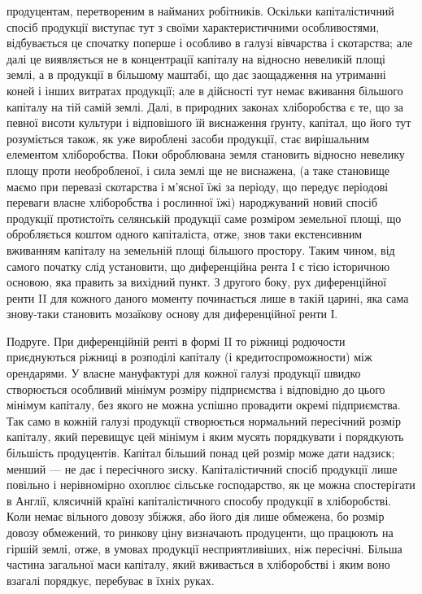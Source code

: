\parcont{}  %
продуцентам, перетвореним в найманих робітників. Оскільки капіталістичний
спосіб продукції виступає тут з своїми характеристичними особливостями,
відбувається це спочатку поперше і особливо в галузі вівчарства і скотарства;
але далі це виявляється не в концентрації капіталу на відносно невеликій
площі землі, а в продукції в більшому маштабі, що дає заощадження на
утриманні коней і інших витратах продукції; але в дійсності тут немає вживання
більшого капіталу на тій самій землі. Далі, в природних законах хліборобства
є те, що за певної висоти культури і відповішого їй виснаження
ґрунту, капітал, що його тут розуміється також, як уже вироблені засоби
продукції, стає вирішальним елементом хліборобства. Поки оброблювана
земля становить відносно невелику площу проти необробленої, і сила землі ще
не виснажена, (а таке становище маємо при перевазі скотарства і м’ясної їжі
за періоду, що передує періодові переваги власне хліборобства і рослинної їжі)
народжуваний новий спосіб продукції протистоїть селянській продукції саме розміром
земельної площі, що обробляється коштом одного капіталіста, отже, знов таки
екстенсивним вживанням капіталу на земельній площі більшого простору. Таким
чином, від самого початку слід установити, що диференційна рента І є тією
історичною основою, яка править за вихідний пункт. З другого боку, рух диференційної
ренти II для кожного даного моменту починається лише в такій царині,
яка сама знову-таки становить мозаїкову основу для диференційної ренти І.

Подруге. При диференційній ренті в формі II то ріжниці родючости приєднуються
ріжниці в розподілі капіталу (і кредитоспроможности) між орендарями.
У власне мануфактурі для кожної галузі продукції швидко створюється особливий
мінімум розміру підприємства і відповідно до цього мінімум капіталу,
без якого не можна успішно провадити окремі підприємства. Так само в кожній
галузі продукції створюється нормальний пересічний розмір капіталу, який
перевищує цей мінімум і яким мусять порядкувати і порядкують більшість продуцентів.
Капітал більший понад цей розмір може дати надзиск; менший — не
дає і пересічного зиску. Капіталістичний спосіб продукції лише повільно і нерівномірно
охоплює сільське господарство, як це можна спостерігати в Англії,
клясичній країні капіталістичного способу продукції в хліборобстві. Коли немає
вільного довозу збіжжя, або його дія лише обмежена, бо розмір довозу обмежений,
то ринкову ціну визначають продуценти, що працюють на гіршій землі,
отже, в умовах продукції несприятливіших, ніж пересічні. Більша частина загальної
маси капіталу, який вживається в хліборобстві і яким воно взагалі
порядкує, перебуває в їхніх руках.

